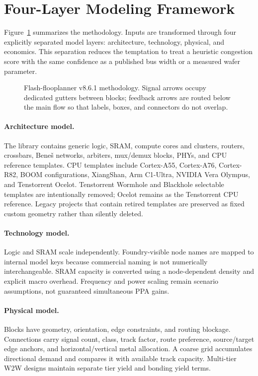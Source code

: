 \section{Four-Layer Modeling Framework}
Figure~\ref{fig:framework} summarizes the methodology. Inputs are transformed through four explicitly separated model layers: architecture, technology, physical, and economics. This separation reduces the temptation to treat a heuristic congestion score with the same confidence as a published bus width or a measured wafer parameter.

\begin{figure}[t]
\centering

\caption{Flash-flooplanner v8.6.1 methodology. Signal arrows occupy dedicated gutters between blocks; feedback arrows are routed below the main flow so that labels, boxes, and connectors do not overlap.}
\label{fig:framework}
\end{figure}

\paragraph{Architecture model.}
The library contains generic logic, SRAM, compute cores and clusters, routers, crossbars, Bene\v{s} networks, arbiters, mux/demux blocks, PHYs, and CPU reference templates. CPU templates include Cortex-A55, Cortex-A76, Cortex-R82, BOOM configurations, XiangShan, Arm C1-Ultra, NVIDIA Vera Olympus, and Tenstorrent Ocelot. Tenstorrent Wormhole and Blackhole selectable templates are intentionally removed; Ocelot remains as the Tenstorrent CPU reference. Legacy projects that contain retired templates are preserved as fixed custom geometry rather than silently deleted.

\paragraph{Technology model.}
Logic and SRAM scale independently. Foundry-visible node names are mapped to internal model keys because commercial naming is not numerically interchangeable. SRAM capacity is converted using a node-dependent density and explicit macro overhead. Frequency and power scaling remain scenario assumptions, not guaranteed simultaneous PPA gains.

\paragraph{Physical model.}
Blocks have geometry, orientation, edge constraints, and routing blockage. Connections carry signal count, class, track factor, route preference, source/target edge anchors, and horizontal/vertical metal allocation. A coarse grid accumulates directional demand and compares it with available track capacity. Multi-tier W2W designs maintain separate tier yield and bonding yield terms.

